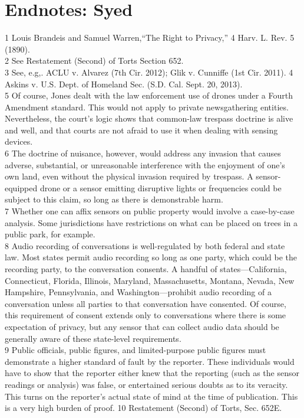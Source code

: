 \section{Endnotes: Syed}
1 Louis Brandeis and Samuel Warren,``The Right to Privacy,'' 4 Harv. L. Rev. 5 (1890).\\
2 See Restatement (Second) of Torts Section 652.\\
3 See, e.g,. ACLU v. Alvarez (7th Cir. 2012); Glik v. Cunniffe (1st Cir. 2011).
4 Askins v. U.S. Dept. of Homeland Sec. (S.D. Cal. Sept. 20, 2013).\\
5 Of course, Jones dealt with the law enforcement use of drones under a Fourth Amendment
standard. This would not apply to private newsgathering entities. Nevertheless, the court's logic
shows that common-law trespass doctrine is alive and well, and that courts are not afraid to use it
when dealing with sensing devices.\\
6 The doctrine of nuisance, however, would address any invasion that causes adverse, substantial,
or unreasonable interference with the enjoyment of one's own land, even without the physical
invasion required by trespass. A sensor-equipped drone or a sensor emitting disruptive lights or
frequencies could be subject to this claim, so long as there is demonstrable harm.\\
7 Whether one can affix sensors on public property would involve a case-by-case analysis.
Some jurisdictions have restrictions on what can be placed on trees in a public park, for example.\\
8 Audio recording of conversations is well-regulated by both federal and state law. Most states
permit audio recording so long as one party, which could be the recording party, to the
conversation consents. A handful of states—California, Connecticut, Florida, Illinois, Maryland,
Massachusetts, Montana, Nevada, New Hampshire, Pennsylvania, and Washington—prohibit
audio recording of a conversation unless all parties to that conversation have consented.
Of course, this requirement of consent extends only to conversations where there is some
expectation of privacy, but any sensor that can collect audio data should be generally aware of
these state-level requirements.\\
9 Public officials, public figures, and limited-purpose public figures must demonstrate a higher
standard of fault by the reporter. These individuals would have to show that the reporter either
knew that the reporting (such as the sensor readings or analysis) was false, or entertained
serious doubts as to its veracity. This turns on the reporter's actual state of mind at the time of publication. This is a very high burden of proof.
10 Restatement (Second) of Torts, Sec. 652E.\\

